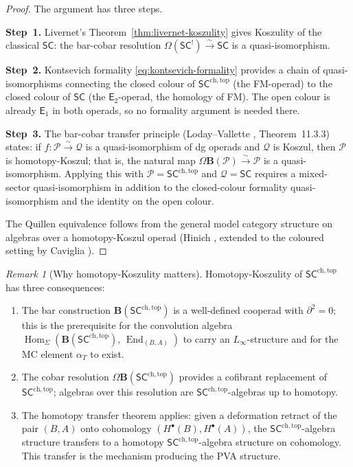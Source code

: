 \documentclass[11pt,reqno]{amsart}
\theoremstyle{definition}
\theoremstyle{remark}
\newtheorem{remark}[theorem]{Remark}
\newcommand{\cP}{\mathcal{P}}
\newcommand{\cQ}{\mathcal{Q}}
\newcommand{\Linf}{L_{\infty}}
\newcommand{\Eone}{\mathsf{E}_{1}}
\newcommand{\Etwo}{\mathsf{E}_{2}}
\newcommand{\SC}{\mathsf{SC}}
\newcommand{\SCchtop}{\mathsf{SC}^{\mathrm{ch,top}}}
\DeclareMathOperator{\Hom}{Hom}
\DeclareMathOperator{\End}{End}
\numberwithin{equation}{section}
\begin{document}
\begin{proof}
The argument has three steps.

\medskip\noindent\textbf{Step~1.}
Livernet's Theorem~\ref{thm:livernet-koszulity} gives
Koszulity of the classical $\SC$: the bar-cobar
resolution $\Omega(\SC^!) \xrightarrow{\sim} \SC$ is a
quasi-isomorphism.

\medskip\noindent\textbf{Step~2.}
Kontsevich formality \eqref{eq:kontsevich-formality} provides
a chain of quasi-isomorphisms connecting the closed colour
of $\SCchtop$ (the FM-operad) to the closed colour of $\SC$
(the $\Etwo$-operad, the homology of FM).  The open colour is
already $\Eone$ in both operads, so no formality argument is
needed there.

\medskip\noindent\textbf{Step~3.}
The bar-cobar transfer principle
(Loday--Vallette \cite{LV12}, Theorem~11.3.3) states: if
$f \colon \cP \xrightarrow{\sim} \cQ$ is a quasi-isomorphism
of dg operads and $\cQ$ is Koszul, then $\cP$ is
homotopy-Koszul; that is, the natural map
$\Omega\mathbf{B}(\cP) \xrightarrow{\sim} \cP$ is a
quasi-isomorphism. Applying this with $\cP = \SCchtop$ and
$\cQ = \SC$ requires a mixed-sector quasi-isomorphism in addition to
the closed-colour formality quasi-isomorphism and the identity on the
open colour.

The Quillen equivalence follows from the general model category
structure on algebras over a homotopy-Koszul operad
(Hinich \cite{Hin97}, extended to the coloured setting by
Caviglia \cite{Cav14}).
\end{proof}

\begin{remark}[Why homotopy-Koszulity matters]
\label{rem:homotopy-koszul-consequences}
Homotopy-Koszulity of $\SCchtop$ has three consequences:
\begin{enumerate}[label=(\alph*)]
\item The bar construction $\mathbf{B}(\SCchtop)$ is a
  well-defined cooperad with $\partial^2 = 0$; this is the
  prerequisite for the convolution algebra
  $\Hom_\Sigma(\mathbf{B}(\SCchtop),\, \End_{(B,A)})$ to
  carry an $\Linf$-structure and for the MC element $\alpha_T$
  to exist.
\item The cobar resolution $\Omega\mathbf{B}(\SCchtop)$ provides
  a cofibrant replacement of $\SCchtop$; algebras over this
  resolution are $\SCchtop$-algebras up to homotopy.
\item The homotopy transfer theorem applies: given a deformation
  retract of the pair $(B,A)$ onto cohomology $(H^\bullet(B),
  H^\bullet(A))$, the $\SCchtop$-algebra structure transfers to
  a homotopy $\SCchtop$-algebra structure on cohomology.  This
  transfer is the mechanism producing the PVA structure.
\end{enumerate}
\end{remark}
\end{document}
